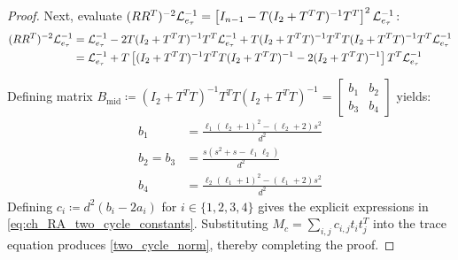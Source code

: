 \begin{proof}
Next, evaluate $(R R^T)^{-2} \mathcal{L}_{e_{\tau}}^{-1} = \left[ I_{n-1} - T (I_2 + T^T T)^{-1} T^T \right]^2 \mathcal{L}_{e_{\tau}}^{-1}$:
\begin{align}\label{eq:ch_RA_RRT_sq_2cycle}
	(R R^T)^{-2} \mathcal{L}_{e_{\tau}}^{-1} &= \mathcal{L}_{e_{\tau}}^{-1} - 2 T (I_2 + T^T T)^{-1} T^T \mathcal{L}_{e_{\tau}}^{-1} + T (I_2 + T^T T)^{-1} T^T T (I_2 + T^T T)^{-1} T^T \mathcal{L}_{e_{\tau}}^{-1} \nonumber \\
	&= \mathcal{L}_{e_{\tau}}^{-1} + T \left[ (I_2 + T^T T)^{-1} T^T T (I_2 + T^T T)^{-1} - 2 (I_2 + T^T T)^{-1} \right] T^T \mathcal{L}_{e_{\tau}}^{-1}
\end{align}

Defining matrix $B_{\text{mid}} \coloneqq (I_2 + T^T T)^{-1} T^T T (I_2 + T^T T)^{-1} = \begin{bmatrix} b_1 & b_2 \\ b_3 & b_4 \end{bmatrix}$ yields:
\begin{align}\label{eq:ch_RA_b_coefficients}
	b_1 &= \frac{\ell_1(\ell_2+1)^2 - (\ell_2+2)s^2}{d^2} \nonumber \\
	b_2 = b_3 &= \frac{s(s^2 + s - \ell_1 \ell_2)}{d^2} \nonumber \\
	b_4 &= \frac{\ell_2(\ell_1+1)^2 - (\ell_1+2)s^2}{d^2}
\end{align}
Defining $c_i \coloneqq d^2 (b_i - 2a_i)$ for $i \in \{1, 2, 3, 4\}$ gives the explicit expressions in \eqref{eq:ch_RA_two_cycle_constants}. Substituting $M_c = \sum_{i,j} c_{i,j} t_i t_j^T$ into the trace equation produces \eqref{two_cycle_norm}, thereby completing the proof.
\end{proof}

